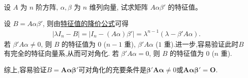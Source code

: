 \documentclass[../../main.tex]{subfiles}%
\begin{document}
\begin{example}\label{example-6.10}
设 $A$ 为 $n$ 阶方阵, $\alpha, \beta$ 为 $n$ 维列向量, 试求矩阵 $A \alpha \beta'$ 的特征值。
\end{example}
\begin{solution}

设 $B = A \alpha \beta'$, 则由\hyperref[theorem:特征值的降价公式]{特征值的降价公式}可得
\begin{align*}
| \lambda I_n - B | 
= | I_n - (A \alpha) \beta' | 
= \lambda^{n-1} (\lambda - \beta' A \alpha).
\end{align*}
若 $\beta' A \alpha \neq 0$, 则 $B$ 的特征值为 $0$ ($n-1$ 重), $\beta' A \alpha$ ($1$ 重).进一步,容易验证此时$B$有完全的特征向量系,从而可对角化.
若 $\beta' A \alpha = 0$, 则 $B$ 的特征值为 $0$ ($n$ 重).

综上,容易验证\(B=\boldsymbol{A}\boldsymbol{\alpha}\boldsymbol{\beta}'\)可对角化的充要条件是\(\boldsymbol{\beta}'\boldsymbol{A}\boldsymbol{\alpha}\neq 0\)或\(\boldsymbol{A}\boldsymbol{\alpha}\boldsymbol{\beta}' = \boldsymbol{O}\).

\end{solution}
\end{document}
